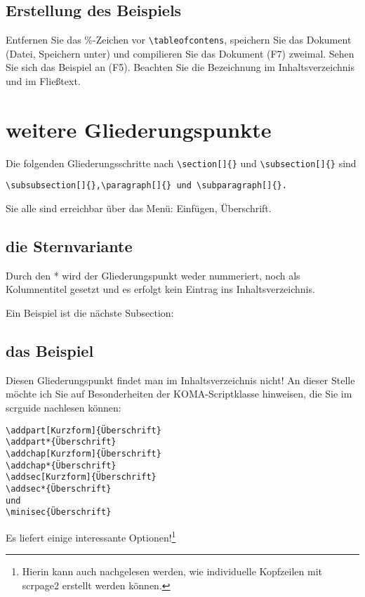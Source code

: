 \documentclass[a4paper,%
twoside,							%
headsepline=true,				%
footsepline=true,				%
headings=normal,
listof=totoc,					%
bibliography=totoc,			%
listof=entryprefix,
]
{scrartcl}
\begin{document}
\subsection{Erstellung des Beispiels}
Entfernen Sie das \%-Zeichen vor \verb#\tableofcontens#, speichern Sie das Dokument (Datei, Speichern unter) und compilieren Sie das Dokument (F7) zweimal. Sehen Sie sich das Beispiel an (F5). Beachten Sie die Bezeichnung im Inhaltsverzeichnis und im Fließtext.

\section{weitere Gliederungspunkte}
Die folgenden Gliederungsschritte nach \verb#\section[]{}# und \verb#\subsection[]{}# sind 
\begin{verbatim}
\subsubsection[]{},\paragraph[]{} und \subparagraph[]{}.
\end{verbatim}

Sie alle sind erreichbar über das Menü: Einfügen, Überschrift.

\subsection{die Sternvariante}
Durch den * wird der Gliederungspunkt weder nummeriert, noch als Kolumnentitel gesetzt und es erfolgt kein Eintrag
ins Inhaltsverzeichnis.

Ein Beispiel ist die nächste Subsection:

\subsection*{das Beispiel}
Diesen Gliederungspunkt findet man im Inhaltsverzeichnis nicht!
An dieser Stelle möchte ich Sie auf Besonderheiten der KOMA-Scriptklasse hinweisen, die Sie im scrguide nachlesen können:
\begin{verbatim}
\addpart[Kurzform]{Überschrift}
\addpart*{Überschrift}
\addchap[Kurzform]{Überschrift}
\addchap*{Überschrift}
\addsec[Kurzform]{Überschrift}
\addsec*{Überschrift}
und
\minisec{Überschrift}
\end{verbatim}
Es liefert einige interessante Optionen!\footnote{Hierin kann auch nachgelesen werden, wie individuelle Kopfzeilen mit scrpage2 erstellt werden können.}
\end{document}
